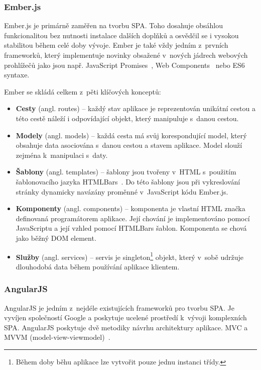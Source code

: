\subsubsection*{Ember.js}

Ember.js je primárně zaměřen na tvorbu SPA. Toho dosahuje obsáhlou funkcionalitou bez nutnosti instalace dalších doplňků a osvědčil se i vysokou stabilitou během celé doby vývoje. Ember je také vždy jedním z~prvních frameworků, který implementuje novinky obsažené v~nových jádrech webových prohlížečů jako jsou např. JavaScript Promises~\cite{jspromises}, Web Components~\cite{webcomponents} nebo ES6 syntaxe.

Ember se skládá celkem z~pěti klíčových konceptů:

\begin{itemize}  
    \item {\bf Cesty} (angl. routes) -- každý stav aplikace je reprezentován unikátní cestou a této cestě náleží i odpovídající objekt, který manipuluje s~danou cestou.
    \item {\bf Modely} (angl. models) -- každá cesta má svůj korespondující model, který obsahuje data asociována s~danou cestou a stavem aplikace. Model slouží zejména k~manipulaci s~daty.
    \item {\bf Šablony} (angl. templates) -- šablony jsou tvořeny v~HTML s~použitím šablonovacího jazyka HTMLBars~\cite{htmlbars}. Do této šablony jsou při vykreslování stránky dynamicky navázány proměnné v~JavaScript kódu Ember.js. 
    \item {\bf Komponenty} (angl. components) -- komponenta je vlastní HTML značka definovaná programátorem aplikace. Její chování je implementováno pomocí JavaScriptu a její vzhled pomocí HTMLBars šablon. Komponenta se chová jako běžný DOM element.
    \item {\bf Služby} (angl. services) -- servis je singleton\footnote{Během doby běhu aplikace lze vytvořit pouze jednu instanci třídy.} objekt, který v~sobě udržuje dlouhodobá data během používání aplikace klientem.
\end{itemize}

\subsubsection*{AngularJS}

AngularJS je jedním z~nejdéle existujících frameworků pro tvorbu SPA. Je vyvíjen společností Google a poskytuje ucelené prostředí k~vývoji komplexních SPA. AngularJS poskytuje dvě metodiky návrhu architektury aplikace. MVC a MVVM (model-view-viewmodel)~\cite{mvvm}.

